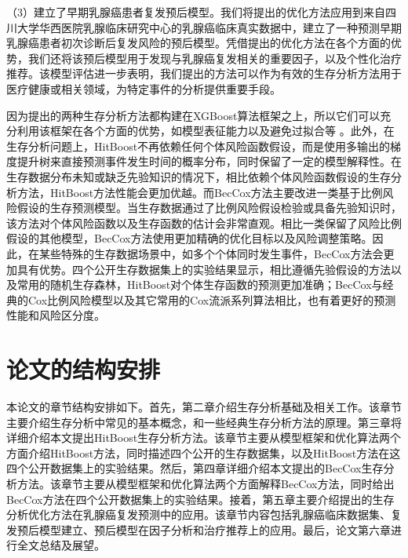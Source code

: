 （3）建立了早期乳腺癌患者复发预后模型。我们将提出的优化方法应用到来自四川大学华西医院乳腺临床研究中心的乳腺癌临床真实数据中，建立了一种预测早期乳腺癌患者初次诊断后复发风险的预后模型。凭借提出的优化方法在各个方面的优势，我们还将该预后模型用于发现与乳腺癌复发相关的重要因子，以及个性化治疗推荐。该模型评估进一步表明，我们提出的方法可以作为有效的生存分析方法用于医疗健康或相关领域，为特定事件的分析提供重要手段。

因为提出的两种生存分析方法都构建在XGBoost算法框架之上，所以它们可以充分利用该框架在各个方面的优势，如模型表征能力以及避免过拟合等 。此外，在生存分析问题上，HitBoost不再依赖任何个体风险函数假设，而是使用多输出的梯度提升树来直接预测事件发生时间的概率分布，同时保留了一定的模型解释性。在生存数据分布未知或缺乏先验知识的情况下，相比依赖个体风险函数假设的生存分析方法，HitBoost方法性能会更加优越。而BecCox方法主要改进一类基于比例风险假设的生存预测模型。当生存数据通过了比例风险假设检验或具备先验知识时，该方法对个体风险函数以及生存函数的估计会非常直观。相比一类保留了风险比例假设的其他模型，BecCox方法使用更加精确的优化目标以及风险调整策略。因此，在某些特殊的生存数据场景中，如多个个体同时发生事件，BecCox方法会更加具有优势。四个公开生存数据集上的实验结果显示，相比遵循先验假设的方法以及常用的随机生存森林，HitBoost对个体生存函数的预测更加准确；BecCox与经典的Cox比例风险模型以及其它常用的Cox流派系列算法相比，也有着更好的预测性能和风险区分度。

\section{论文的结构安排}

本论文的章节结构安排如下。首先，第二章介绍生存分析基础及相关工作。该章节主要介绍生存分析中常见的基本概念，和一些经典生存分析方法的原理。第三章将详细介绍本文提出HitBoost生存分析方法。该章节主要从模型框架和优化算法两个方面介绍HitBoost方法，同时描述四个公开的生存数据集，以及HitBoost方法在这四个公开数据集上的实验结果。然后，第四章详细介绍本文提出的BecCox生存分析方法。该章节主要从模型框架和优化算法两个方面解释BecCox方法，同时给出BecCox方法在四个公开数据集上的实验结果。接着，第五章主要介绍提出的生存分析优化方法在乳腺癌复发预测中的应用。该章节内容包括乳腺癌临床数据集、复发预后模型建立、预后模型在因子分析和治疗推荐上的应用。最后，论文第六章进行全文总结及展望。
